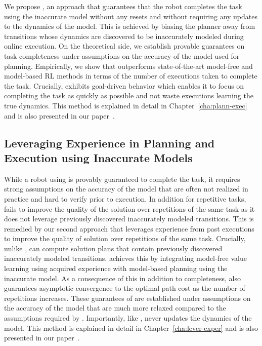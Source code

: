   We propose \cmax{}, an approach that guarantees that the robot
  completes the task using the inaccurate model without any resets and
  without requiring any updates to the dynamics of the model. This is
  achieved by biasing the planner away from transitions whose dynamics
  are discovered to be inaccurately modeled during online
  execution. On the theoretical side, we establish provable guarantees
  on task completeness under assumptions on the accuracy of the model
  used for planning. Empirically, we show that \cmax{} outperforms
  state-of-the-art model-free and model-based RL methods in terms of
  the number of executions taken to complete the task. Crucially,
  \cmax{} exhibits goal-driven behavior which enables it to focus on
  completing the task as quickly as possible and not waste executions  
  learning the true dynamics. This method is explained in detail in
  Chapter~\ref{cha:plann-exec} and is also presented in our
  paper~\cite{cmax}.

\subsection{Leveraging Experience in Planning and Execution using
  Inaccurate Models}
\label{sec:lever-exper-plann}
  
While a robot using \cmax{} is provably guaranteed to complete
  the task, it requires strong assumptions on the accuracy of the
  model that are often not realized in practice and hard to verify
  prior to execution. In addition for repetitive tasks, \cmax{} fails
  to improve the quality of the solution over repetitions of the same
  task as it does not leverage previously discovered inaccurately
  modeled transitions. This is remedied by our second approach
  \cmaxpp{} that leverages experience from past executions to improve
  the quality of solution over repetitions of the same
  task. Crucially, unlike \cmax{}, \cmaxpp{} can compute solution
  plans that contain previously discovered inaccurately modeled
  transitions. \cmaxpp{} achieves this by integrating model-free value
  learning using acquired experience with model-based planning using
  the inaccurate model. As a consequence of this in addition to
  completeness, \cmaxpp{} also guarantees asymptotic convergence to
  the optimal path cost as the number of repetitions increases. These
  guarantees of \cmaxpp{} are established under assumptions on the
  accuracy of the model that are much more relaxed compared to the
  assumptions required by \cmax{}. Importantly, like \cmax{},
  \cmaxpp{} never updates the dynamics of the model. This method is
  explained in detail in Chapter~\ref{cha:lever-exper} and is also 
  presented in our paper~\cite{cmaxpp}.




